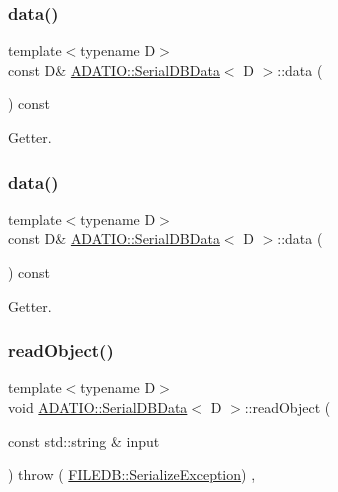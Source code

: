 \subsubsection{\texorpdfstring{data()}{data()}\hspace{0.1cm}{\footnotesize\ttfamily [5/6]}}
{\footnotesize\ttfamily template$<$typename D$>$ \\
const D\& \mbox{\hyperlink{classADATIO_1_1SerialDBData}{A\+D\+A\+T\+I\+O\+::\+Serial\+D\+B\+Data}}$<$ D $>$\+::data (\begin{DoxyParamCaption}{ }\end{DoxyParamCaption}) const\hspace{0.3cm}{\ttfamily [inline]}}



Getter. 

\mbox{\label{classADATIO_1_1SerialDBData_a5532be95ec6214348c087afd8b2ff683}} 
\subsubsection{\texorpdfstring{data()}{data()}\hspace{0.1cm}{\footnotesize\ttfamily [6/6]}}
{\footnotesize\ttfamily template$<$typename D$>$ \\
const D\& \mbox{\hyperlink{classADATIO_1_1SerialDBData}{A\+D\+A\+T\+I\+O\+::\+Serial\+D\+B\+Data}}$<$ D $>$\+::data (\begin{DoxyParamCaption}{ }\end{DoxyParamCaption}) const\hspace{0.3cm}{\ttfamily [inline]}}



Getter. 

\mbox{\label{classADATIO_1_1SerialDBData_a2f7405b96f413b1787fc2072b8932c20}} 
\subsubsection{\texorpdfstring{readObject()}{readObject()}\hspace{0.1cm}{\footnotesize\ttfamily [1/3]}}
{\footnotesize\ttfamily template$<$typename D$>$ \\
void \mbox{\hyperlink{classADATIO_1_1SerialDBData}{A\+D\+A\+T\+I\+O\+::\+Serial\+D\+B\+Data}}$<$ D $>$\+::read\+Object (\begin{DoxyParamCaption}\item[{const std\+::string \&}]{input }\end{DoxyParamCaption}) throw ( \mbox{\hyperlink{classFILEDB_1_1SerializeException}{F\+I\+L\+E\+D\+B\+::\+Serialize\+Exception}}) \hspace{0.3cm}{\ttfamily [inline]}, {\ttfamily [virtual]}}

